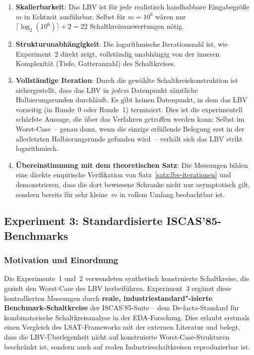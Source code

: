 ﻿\documentclass[a4paper,12pt]{article}
\theoremstyle{definition}
\begin{document}
\begin{enumerate}
  \item \textbf{Skalierbarkeit}: Das LBV ist für jede realistisch handhabbare Eingabegröße~$m$
    in Echtzeit ausführbar.  Selbst für $m = 10^6$ wären nur $\lceil\log_2(10^6)\rceil + 2 = 22$
    Schaltkreisauswertungen nötig.

  \item \textbf{Strukturunabhängigkeit}: Die logarithmische Iterationszahl ist, wie
    Experiment~2 direkt zeigt, vollständig unabhängig von der inneren Komplexität
    (Tiefe, Gatteranzahl) des Schaltkreises.

  \item \textbf{Vollständige Iteration}: Durch die gewählte Schaltkreiskonstruktion
    ist sichergestellt, dass das LBV in \emph{jedem} Datenpunkt sämtliche Halbierungsrunden
    durchläuft.  Es gibt keinen Datenpunkt, in dem das LBV vorzeitig (in Runde~0 oder
    Runde~1) terminiert.  Dies ist die experimentell schärfste Aussage, die über das
    Verfahren getroffen werden kann: Selbst im Worst-Case~-- genau dann, wenn die
    einzige erfüllende Belegung erst in der allerletzten Halbieru\-ngsrunde
    gefunden wird~-- verhält sich das LBV strikt logarithmisch.

  \item \textbf{Übereinstimmung mit dem theoretischen Satz}: Die Messungen bilden eine
    direkte empirische Verifikation von Satz~\ref{satz:lbv-iterationen} und demonstrieren,
    dass die dort bewiesene Schranke nicht nur asymptotisch gilt, sondern bereits für
    sehr kleine~$m$ in vollem Umfang beobachtbar ist.
\end{enumerate}

\subsection{Experiment 3: Standardisierte ISCAS'85-Benchmarks}
\label{subsec:exp3}

\subsubsection{Motivation und Einordnung}

Die Experimente~1 und~2 verwendeten synthetisch konstruierte Schaltkreise,
die gezielt den Worst-Case des LBV herbeiführen.  Experiment~3 ergänzt
diese kontrollierten Messungen durch \textbf{reale, industriestandard"-isierte
Benchmark-Schaltkreise} der ISCAS'85-Suite \cite{Brglez85} -- dem
De-facto-Standard für kombinatorische Schaltkreisanalyse in der
EDA-Forschung.  Dies erlaubt erstmals einen Vergleich des LSAT-Frameworks
mit der externen Literatur und belegt, dass die LBV-Überlegenheit nicht auf
konstruierte Worst-Case-Strukturen beschränkt ist, sondern auch auf
realen Industrieschaltkreisen reproduzierbar ist.
\end{document}

